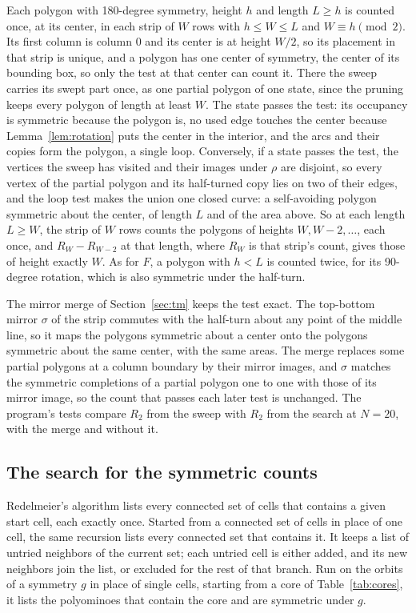 \documentclass[11pt]{a000104}
\numberwithin{equation}{section}
\begin{document}
Each polygon with 180-degree symmetry, height $h$ and length $L \ge h$ is counted once, at its center, in each strip of $W$ rows with $h \le W \le L$ and $W \equiv h \pmod 2$.
Its first column is column $0$ and its center is at height $W/2$, so its placement in that strip is unique, and a polygon has one center of symmetry, the center of its bounding box, so only the test at that center can count it.
There the sweep carries its swept part once, as one partial polygon of one state, since the pruning keeps every polygon of length at least $W$.
The state passes the test: its occupancy is symmetric because the polygon is, no used edge touches the center because Lemma~\ref{lem:rotation} puts the center in the interior, and the arcs and their copies form the polygon, a single loop.
Conversely, if a state passes the test, the vertices the sweep has visited and their images under $\rho$ are disjoint, so every vertex of the partial polygon and its half-turned copy lies on two of their edges, and the loop test makes the union one closed curve: a self-avoiding polygon symmetric about the center, of length $L$ and of the area above.
So at each length $L \ge W$, the strip of $W$ rows counts the polygons of heights $W, W - 2, \ldots$, each once, and $R_W - R_{W-2}$ at that length, where $R_W$ is that strip's count, gives those of height exactly $W$.
As for $F$, a polygon with $h < L$ is counted twice, for its 90-degree rotation, which is also symmetric under the half-turn.

The mirror merge of Section~\ref{sec:tm} keeps the test exact.
The top-bottom mirror $\sigma$ of the strip commutes with the half-turn about any point of the middle line, so it maps the polygons symmetric about a center onto the polygons symmetric about the same center, with the same areas.
The merge replaces some partial polygons at a column boundary by their mirror images, and $\sigma$ matches the symmetric completions of a partial polygon one to one with those of its mirror image, so the count that passes each later test is unchanged.
The program's tests compare $R_2$ from the sweep with $R_2$ from the search at $N = 20$, with the merge and without it.

\subsection{The search for the symmetric counts}\label{sec:search}

Redelmeier's algorithm \parencite{Redelmeier:1981} lists every connected set of cells that contains a given start cell, each exactly once.
Started from a connected set of cells in place of one cell, the same recursion lists every connected set that contains it.
It keeps a list of untried neighbors of the current set; each untried cell is either added, and its new neighbors join the list, or excluded for the rest of that branch.
Run on the orbits of a symmetry $g$ in place of single cells, starting from a core of Table~\ref{tab:cores}, it lists the polyominoes that contain the core and are symmetric under $g$.
\end{document}
